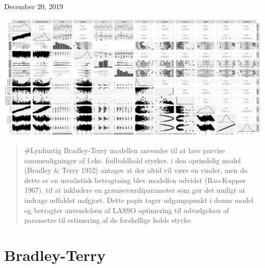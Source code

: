 \documentclass[11pt,a4paper]{article}
\renewcommand*\contentsname{Table of Contents}
\begin{document}
\begin{titlepage}
	
	
	\vfill\vfill\vfill %
	
	{\large{December 20, 2019}} %
	
	
	\includegraphics[width=0.8 \textwidth]{kaosmuch.png}\\[1cm] %
	 
	
	\vfill %
	
\end{titlepage}
\renewcommand{\contentsname}{Indholdsfortegnelse}
\clearpage
\tableofcontents
\clearpage
\newpage
{}
\begin{abstract}
    #Lynhurtig Bradley-Terry modellen anvendes til at lave parvise sammenligninger af f.eks. fodboldhold styrker. i den oprindelig model (Bradley & Terry 1952) antages at der altid vil være en vinder, men da dette er en urealistisk betragtning blev modellen udvidet (Rao-Kupper 1967). til at inkludere en grænseværdiparameter som gør det muligt at indrage udfaldet uafgjort. Dette papir tager udgangspunkt i denne model og betragter anvendelsen af LASSO optimering til udvælgelsen af parametre til estimering af de forskellige holds styrke. 
\end{abstract}
\section{Bradley-Terry}
\end{document}
